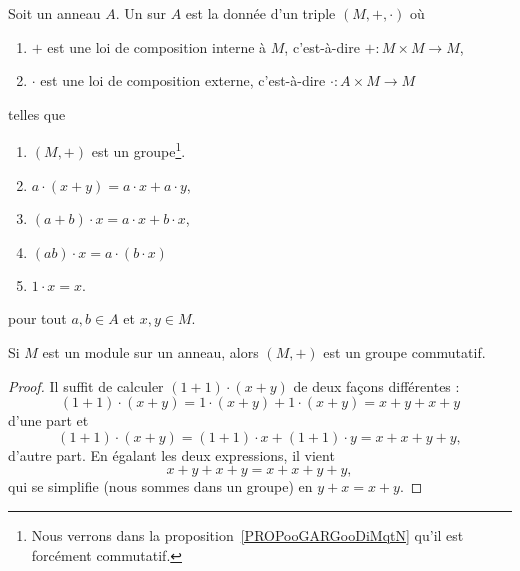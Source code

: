 \begin{definition}       \label{DEFooHXITooBFvzrR}
    Soit un anneau \( A\). Un  sur \( A\) est la donnée d'un triple \( (M,+,\cdot)\) où
    \begin{enumerate}
        \item
            \( +\) est une loi de composition interne à \( M\), c'est-à-dire \( +\colon M\times M\to M\),
        \item
            \( \cdot\) est une loi de composition externe, c'est-à-dire \( \cdot\colon A\times M\to M\)
    \end{enumerate}
    telles que
    \begin{enumerate}
        \item
            \( (M,+)\) est un groupe\footnote{Nous verrons dans la proposition~\ref{PROPooGARGooDiMqtN} qu'il est forcément commutatif.}.
        \item
            \( a\cdot(x+y)=a\cdot x+a\cdot y\),
        \item
            \( (a+b)\cdot x=a\cdot x+b\cdot x\),
        \item
            \( (ab)\cdot x=a\cdot(b\cdot x)\)
        \item
            \( 1\cdot x=x\).
    \end{enumerate}
    pour tout \( a,b\in A\) et \( x,y\in M\).
\end{definition}

\begin{proposition}\label{PROPooGARGooDiMqtN}
    Si \( M\) est un module sur un anneau, alors \( (M,+)\) est un groupe commutatif.
\end{proposition}

\begin{proof}
    Il suffit de calculer \( (1+1)\cdot (x+y)\) de deux façons différentes :
    \begin{equation}
        (1+1)\cdot (x+y)=1\cdot (x+y)+1\cdot (x+y)=x+y+x+y
    \end{equation}
    d'une part et
    \begin{equation}
        (1+1)\cdot (x+y)=(1+1)\cdot x+(1+1)\cdot y=x+x+y+y,
    \end{equation}
    d'autre part. En égalant les deux expressions, il vient
    \begin{equation}
        x+y+x+y=x+x+y+y,
    \end{equation}
    qui se simplifie (nous sommes dans un groupe) en \( y+x=x+y\).
\end{proof}

